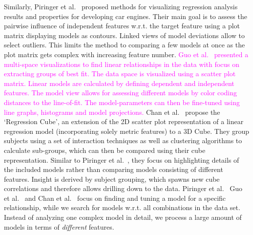 \documentclass[journal]{style/vgtc} 			          %
\newcommand{\magenta}[1]{\textcolor{magenta}{#1}}
\begin{document}
Similarly, Piringer et al.~\cite{Piringer} proposed methods for visualizing regression analysis results and properties for developing car engines.
Their main goal is to assess the pairwise influence of independent features w.r.t. the target feature using a plot matrix displaying models as contours.
Linked views of model deviations allow to select outliers.
This limits the method to comparing a few models at once as the plot matrix gets complex with increasing feature number.
\magenta{
Guo et al.~\cite{Guo} presented a multi-space visualizations to find linear relationships in the data with focus on extracting groups of best fit.
The data space is visualized using a scatter plot matrix.
Linear models are calculated by defining dependent and independent features.
The model view allows for assessing different models by color coding distances to the line-of-fit.
The model-parameters can then be fine-tuned using line graphs, histograms and model projections.
}
Chan et al.~\cite{Chan} propose the `Regression Cube', an extension of the 2D scatter plot representation of a linear regression model (incorporating solely metric features) to a 3D Cube.
They group subjects using a set of interaction techniques as well as clustering algorithms to calculate sub-groups, which can then be compared using their cube representation.
Similar to Piringer et al.~\cite{Piringer}, they focus on highlighting details of the included models rather than comparing models consisting of different features.
Insight is derived by subject grouping, which spawns new cube correlations and therefore allows drilling down to the data.
Piringer et al.~\cite{Piringer} Guo et al.~\cite{Guo} and Chan et al.~\cite{Chan} focus on finding and tuning a model for a specific relationship, while we search for models w.r.t. all combinations in the data set.
Instead of analyzing one complex model in detail, we process a large amount of models in terms of \emph{different} features.
\end{document}

